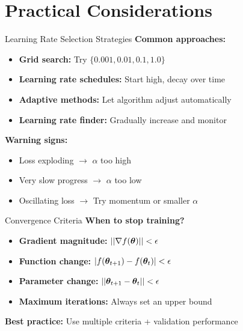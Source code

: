 \documentclass[usenames,dvipsnames]{beamer}
\begin{document}
  \section{Practical Considerations}

  \begin{frame}{Learning Rate Selection Strategies}
    \textbf{Common approaches:}
    
    \begin{itemize}[<+->]
        \item \textbf{Grid search:} Try $\{0.001, 0.01, 0.1, 1.0\}$
        \item \textbf{Learning rate schedules:} Start high, decay over time
        \item \textbf{Adaptive methods:} Let algorithm adjust automatically  
        \item \textbf{Learning rate finder:} Gradually increase and monitor
    \end{itemize}
    
    \pause
    \textbf{Warning signs:}
    \begin{itemize}[<+->]
        \item Loss exploding $\rightarrow$ $\alpha$ too high
        \item Very slow progress $\rightarrow$ $\alpha$ too low
        \item Oscillating loss $\rightarrow$ Try momentum or smaller $\alpha$
    \end{itemize}
  \end{frame}

  \begin{frame}{Convergence Criteria}
    \textbf{When to stop training?}
    
    \begin{itemize}[<+->]
        \item \textbf{Gradient magnitude:} $||\nabla f(\boldsymbol{\theta})|| < \epsilon$
        \item \textbf{Function change:} $|f(\boldsymbol{\theta}_{t+1}) - f(\boldsymbol{\theta}_t)| < \epsilon$
        \item \textbf{Parameter change:} $||\boldsymbol{\theta}_{t+1} - \boldsymbol{\theta}_t|| < \epsilon$
        \item \textbf{Maximum iterations:} Always set an upper bound
    \end{itemize}
    
    \pause
    \begin{keypointsbox}{}
    \textbf{Best practice:} Use multiple criteria + validation performance
    \end{keypointsbox}
  \end{frame}
\end{document}
